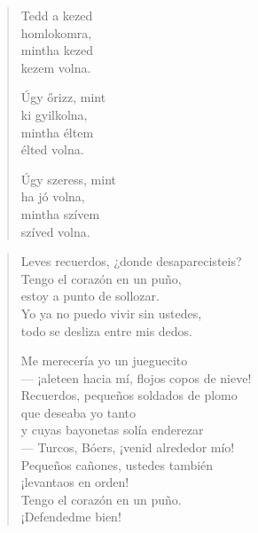 \documentclass[11pt]{extbook}
\newcommand*{\centeredornament}{\centerline{\pgfornament[width=6cm]{88}}}
\begin{document}


\begin{verse}
  Tedd a kezed \\
  homlokomra, \\
  mintha kezed \\
  kezem volna.

  Úgy őrizz, mint \\
  ki gyilkolna, \\
  mintha éltem \\
  élted volna.

  Úgy szeress, mint \\
  ha jó volna, \\
  mintha szívem \\
  szíved volna.
\end{verse}

\newpage

\vspace*{-15mm}
\centeredornament




\begin{verse}
  Leves recuerdos, ¿donde desaparecisteis? \\
  Tengo el corazón en un puño, \\
  estoy a punto de sollozar. \\
  Yo ya no puedo vivir sin ustedes, \\
  todo se desliza entre mis dedos.

  Me merecería yo un jueguecito \\
  --- ¡aleteen hacia mí, flojos copos de nieve! \\
  Recuerdos, pequeños soldados de plomo \\
  que deseaba yo tanto \\
  y cuyas bayonetas solía enderezar \\
  --- Turcos, Bóers, ¡venid alrededor mío! \\
  Pequeños cañones, ustedes también \\
  ¡levantaos en orden! \\
  Tengo el corazón en un puño. \\
  ¡Defendedme bien!
\end{verse}
\end{document}
